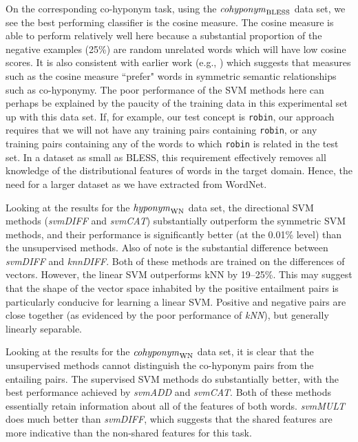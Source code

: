 \documentclass[11pt]{article}
\newcommand\coordBLESS{\mbox{\em cohyponym\/}_{\mbox{\scriptsize BLESS}}}
\newcommand\entWN{\mbox{\em hyponym\/}_{\mbox{\scriptsize WN}}}
\newcommand\coordWN{\mbox{\em cohyponym\/}_{\mbox{\scriptsize WN}}}
\begin{document}
On the corresponding co-hyponym task, using the $\coordBLESS$ data set, we see the best performing classifier is the cosine measure. The cosine measure is able to perform relatively well here because a substantial proportion of the negative examples (25\%) are random unrelated words which will have low cosine scores.  It is also consistent with earlier work (e.g., \cite{Lenci2012}) which suggests that measures such as the cosine measure ``prefer" words in symmetric semantic relationships such as co-hyponymy.  The poor performance of the SVM methods here can perhaps be explained by the paucity of the training data in this experimental set up with this data set.  If, for example, our test concept is \texttt{robin}, our approach requires that we will not have any training pairs containing \texttt{robin}, or any training pairs containing any of the words to which \texttt{robin} is related in the test set.  In a dataset as small as BLESS, this requirement effectively removes all knowledge of the distributional features of words in the target domain.  Hence, the need for a larger dataset as we have extracted from WordNet.

Looking at the results for the $\entWN$ data set, the directional SVM methods (\emph{svmDIFF} and \emph{svmCAT})  substantially outperform the symmetric SVM methods, and their performance is significantly better (at the 0.01\% level) than the unsupervised methods.  Also of note is the substantial difference between \emph{svmDIFF} and \emph{knnDIFF}.  Both of these methods are trained on the differences of vectors.  However, the linear SVM outperforms kNN by 19--25\%.  This may suggest that the shape of the vector space inhabited by the positive entailment pairs is particularly conducive for learning a linear SVM.  Positive and negative pairs are close together (as evidenced by the poor performance of \emph{kNN}), but generally linearly separable.

Looking at the results for the $\coordWN$ data set, it is clear that the unsupervised methods cannot distinguish the co-hyponym pairs from the entailing pairs.  The supervised SVM methods do substantially better, with the best performance achieved by \emph{svmADD} and \emph{svmCAT}.  Both of these methods essentially retain information about all of the features of both words.  \emph{svmMULT} does much better than \emph{svmDIFF}, which suggests that the shared features are more indicative than the non-shared features for this task. 
\end{document}
